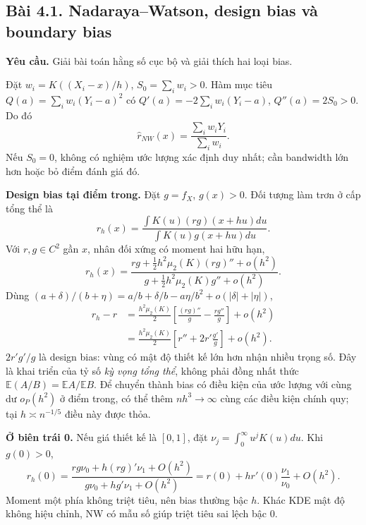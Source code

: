 \documentclass[11pt,a4paper]{article}
\newcommand{\E}{\mathbb E}\newcommand{\Pp}{\mathbb P}
\newcommand{\prob}[3]{\subsection{Bài #1. #2}\label{b:#1}\textbf{Yêu cầu.} #3\par}
\begin{document}
\prob{4.1}{Nadaraya--Watson, design bias và boundary bias}{Giải bài toán hằng số cục bộ và giải thích hai loại bias.}
Đặt $w_i=K((X_i-x)/h)$, $S_0=\sum_iw_i>0$. Hàm mục tiêu
$Q(a)=\sum_iw_i(Y_i-a)^2$ có $Q'(a)=-2\sum_iw_i(Y_i-a)$, $Q''(a)=2S_0>0$. Do đó
\[
\widehat r_{NW}(x)=\frac{\sum_iw_iY_i}{\sum_iw_i}.
\]
Nếu $S_0=0$, không có nghiệm ước lượng xác định duy nhất; cần bandwidth lớn hơn hoặc bỏ điểm đánh giá đó.

\textbf{Design bias tại điểm trong.} Đặt $g=f_X$, $g(x)>0$. Đối tượng làm trơn ở cấp tổng thể là
\[
r_h(x)=\frac{\int K(u)(rg)(x+hu)du}{\int K(u)g(x+hu)du}.
\]
Với $r,g\in C^2$ gần $x$, nhân đối xứng có moment hai hữu hạn,
\[
r_h(x)=\frac{rg+\frac12h^2\mu_2(K)(rg)''+o(h^2)}{g+\frac12h^2\mu_2(K)g''+o(h^2)}.
\]
Dùng $(a+\delta)/(b+\eta)=a/b+\delta/b-a\eta/b^2+o(|\delta|+|\eta|)$,
\begin{align*}
r_h-r&=\frac{h^2\mu_2(K)}2\left[\frac{(rg)''}{g}-\frac{r g''}{g}\right]+o(h^2)\\
&=\frac{h^2\mu_2(K)}2\left[r''+2r'\frac{g'}g\right]+o(h^2).
\end{align*}
$2r'g'/g$ là design bias: vùng có mật độ thiết kế lớn hơn nhận nhiều trọng số. Đây là khai triển của tỷ số \emph{kỳ vọng tổng thể}, không phải đồng nhất thức $\E(A/B)=\E A/\E B$. Để chuyển thành bias có điều kiện của ước lượng với cùng dư $o_P(h^2)$ ở điểm trong, có thể thêm $nh^3\to\infty$ cùng các điều kiện chính quy; tại $h\asymp n^{-1/5}$ điều này được thỏa.

\textbf{Ở biên trái 0.} Nếu giá thiết kế là $[0,1]$, đặt $\nu_j=\int_0^\infty u^jK(u)du$. Khi $g(0)>0$,
\[
r_h(0)=\frac{rg\nu_0+h(rg)'\nu_1+O(h^2)}{g\nu_0+hg'\nu_1+O(h^2)}
=r(0)+h r'(0)\frac{\nu_1}{\nu_0}+O(h^2).
\]
Moment một phía không triệt tiêu, nên bias thường bậc $h$. Khác KDE mật độ không hiệu chỉnh, NW có mẫu số giúp triệt tiêu sai lệch bậc 0.
\end{document}
